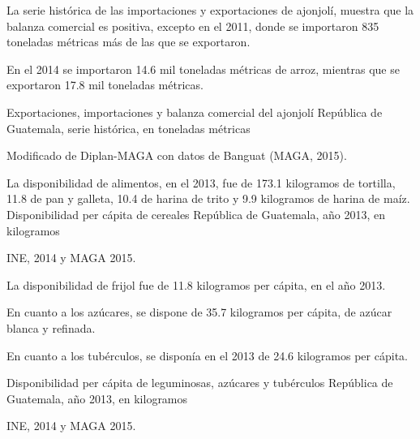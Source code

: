 %
{%
	La serie histórica de las importaciones y exportaciones de ajonjolí, muestra que la balanza comercial es positiva, excepto en el 2011, donde se importaron 835 toneladas métricas más de las que se exportaron.
	
	En el 2014 se importaron 14.6 mil toneladas métricas de arroz, mientras que se exportaron 17.8 mil toneladas métricas. 
}%
{%
	Exportaciones, importaciones y balanza comercial del ajonjolí} %
{%
	República de Guatemala, serie histórica, en toneladas métricas } %
{%
	\begin{tikzpicture}[x=1pt,y=1pt]    \end{tikzpicture}}%
{%
	Modificado de Diplan-MAGA con datos de Banguat (MAGA, 2015).} %


%
{%
La disponibilidad de alimentos, en el 2013, fue de 173.1 kilogramos de tortilla, 11.8 de pan y galleta, 10.4 de harina de trito y 9.9 kilogramos de harina de maíz.}%
{%
	Disponibilidad per cápita de cereales} %
{%
	República de Guatemala, año 2013, en kilogramos } %
{%
	\begin{tikzpicture}[x=1pt,y=1pt]    \end{tikzpicture}}%
{%
	INE, 2014 y MAGA 2015.} %


%
{%
La disponibilidad de frijol fue de 11.8 kilogramos per cápita, en el año 2013.

En cuanto a los azúcares, se dispone de 35.7 kilogramos per cápita, de azúcar blanca y refinada.

En cuanto a los tubérculos, se disponía en el 2013 de 24.6 kilogramos per cápita.}%
{%
	Disponibilidad per cápita de leguminosas, azúcares y tubérculos  } %
{%
	República de Guatemala, año 2013, en kilogramos } %
{%
	\begin{tikzpicture}[x=1pt,y=1pt]    \end{tikzpicture}}%
{%
	INE, 2014 y MAGA 2015.} %

